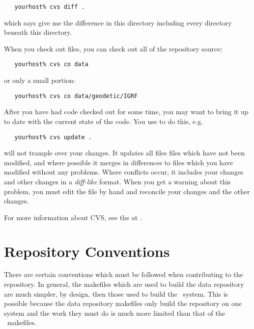 \begin{verbatim}
   yourhost% cvs diff .
\end{verbatim}

\noindent
which says give me the difference in this directory including every directory beneath
this directory.

When you check out files, you can check out all of the repository source:

\begin{verbatim}
   yourhost% cvs co data
\end{verbatim}

\noindent
or only a small portion:

\begin{verbatim}
   yourhost% cvs co data/geodetic/IGRF
\end{verbatim}

After you have had code checked out for some time, you may want to bring it
up to date with the current state of the code. You use  to do
this, e.g.

\begin{verbatim}
   yourhost% cvs update .
\end{verbatim}

\noindent
{} will not trample over your changes. It updates all files
files which have not been modified, and where possible it merges in
differences to files which you have modified without any problems. Where
conflicts occur, it includes your changes and other changes in
a \textit{diff-like} format. When you get a warning about this problem,
you must edit the file by hand and reconcile your changes and the other
changes.

For more information about CVS, see
the 
at .


\section{Repository Conventions}
\label{data repository conventions}

There are certain conventions which must be followed when contributing to
the repository. In general, the makefiles which are used to build the
data repository are much simpler, by design, then those used to build
the \aipspp\ system. This is possible because the data repository makefiles
only build the repository on one system and the work they must do is much
more limited than that of the \aipspp\ makefiles.

